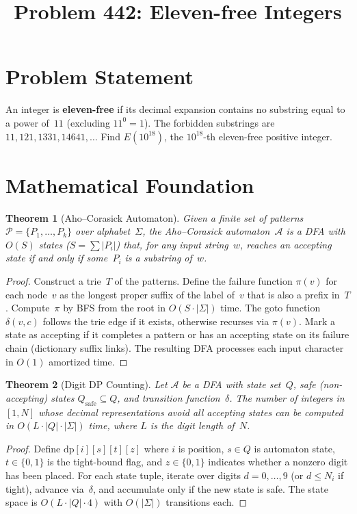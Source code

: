 \documentclass[12pt]{article}
\title{Problem 442: Eleven-free Integers}
\author{}
\date{}
\newtheorem{theorem}{Theorem}
\begin{document}
\maketitle

\section{Problem Statement}
An integer is \textbf{eleven-free} if its decimal expansion contains no substring equal to a power of~$11$ (excluding $11^0 = 1$). The forbidden substrings are $11, 121, 1331, 14641, \ldots$ Find $E(10^{18})$, the $10^{18}$-th eleven-free positive integer.

\section{Mathematical Foundation}

\begin{theorem}[Aho--Corasick Automaton]
Given a finite set of patterns $\mathcal{P} = \{P_1, \ldots, P_k\}$ over alphabet~$\Sigma$, the Aho--Corasick automaton~$\mathcal{A}$ is a DFA with $O(S)$ states ($S = \sum |P_i|$) that, for any input string~$w$, reaches an accepting state if and only if some~$P_i$ is a substring of~$w$.
\end{theorem}

\begin{proof}
Construct a trie~$T$ of the patterns. Define the failure function $\pi(v)$ for each node~$v$ as the longest proper suffix of the label of~$v$ that is also a prefix in~$T$. Compute~$\pi$ by BFS from the root in $O(S \cdot |\Sigma|)$ time. The goto function $\delta(v, c)$ follows the trie edge if it exists, otherwise recurses via $\pi(v)$. Mark a state as accepting if it completes a pattern or has an accepting state on its failure chain (dictionary suffix links). The resulting DFA processes each input character in $O(1)$ amortized time.
\end{proof}

\begin{theorem}[Digit DP Counting]
Let $\mathcal{A}$ be a DFA with state set~$Q$, safe (non-accepting) states $Q_{\mathrm{safe}} \subseteq Q$, and transition function~$\delta$. The number of integers in $[1, N]$ whose decimal representations avoid all accepting states can be computed in $O(L \cdot |Q| \cdot |\Sigma|)$ time, where $L$ is the digit length of~$N$.
\end{theorem}

\begin{proof}
Define $\mathrm{dp}[i][s][t][z]$ where $i$ is position, $s \in Q$ is automaton state, $t \in \{0,1\}$ is the tight-bound flag, and $z \in \{0,1\}$ indicates whether a nonzero digit has been placed. For each state tuple, iterate over digits $d = 0, \ldots, 9$ (or $d \leq N_i$ if tight), advance via~$\delta$, and accumulate only if the new state is safe. The state space is $O(L \cdot |Q| \cdot 4)$ with $O(|\Sigma|)$ transitions each.
\end{proof}
\end{document}
